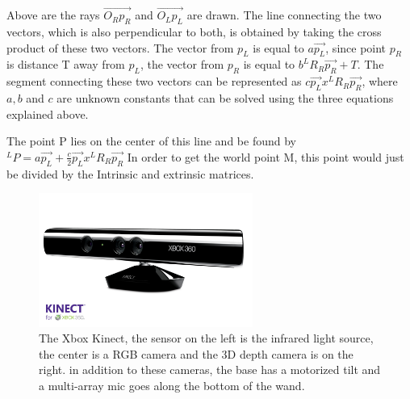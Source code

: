\documentclass[pdftex,10.5pt]{report}
\begin{document}
\begin{center}
\end{center}

Above are the rays $\vec{O_{R}p_{R}}$ and $\vec{O_{L}p_{L}}$ are drawn. The line connecting the two vectors, which is also perpendicular to both, is obtained by taking the cross product of these two vectors. The vector from $p_{L}$ is equal to $a\vec{p_{L}}$, since point $p_{R}$ is distance T away from $p_{L}$, the vector from $p_{R}$ is equal to $b^{L}R_{R}\vec{p_{R}}+T$. The segment connecting these two vectors can be represented as $c\vec{p_{L}}x^{L}R_{R}\vec{p_{R}}$, where $a,b$ and $c$ are unknown constants that can be solved using the three equations explained above.

The point P lies on the center of this line and be found by $^{L}P=a\vec{p_{L}}+\frac{c}{2}\vec{p_{L}}x^{L}R_{R}\vec{p_{R}}$ In order to get the world point M, this point would just be divided by the Intrinsic and extrinsic matrices.

\begin{figure}[H]
	\centering
	\includegraphics[width=70mm]{figures/kinect.jpg}
	\caption{The Xbox Kinect, the sensor on the left is the infrared light source, the center is a RGB camera and the 3D 				depth camera is on the right. in addition to these cameras, the base has a motorized tilt and a multi-array mic 				goes along the bottom of the wand.}
	\label{kinectlable}
\end{figure}
\end{document}
